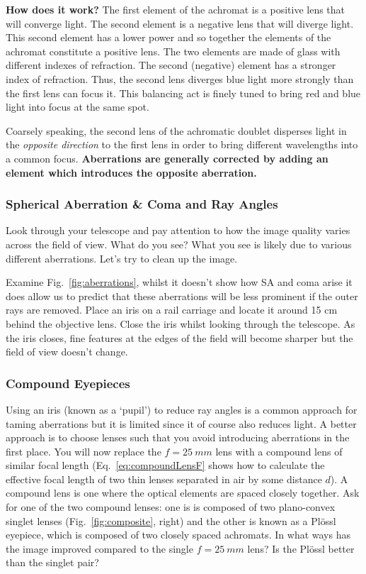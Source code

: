 \documentclass[a4paper]{report}
\begin{document}
	\textbf{How does it work?} 
	The first element of the achromat is a positive lens that will converge light. 
	The second element is a negative lens that will diverge light.
	This second element has a lower power and so together the elements of the achromat constitute a positive lens. 
	The two elements are made of glass with different indexes of refraction. 
	The second (negative) element has a stronger index of refraction. 
	Thus, the second lens diverges blue light more strongly than the first lens can focus it.
	This balancing act is finely tuned to bring red and blue light into focus at the same spot.
	
	Coarsely speaking, the second lens of the achromatic doublet disperses light in the \textit{opposite direction} to the first lens in order to bring different wavelengths into a common focus. 
	\textbf{Aberrations are generally corrected by adding an element which introduces the opposite aberration.}
	
	
	
	
	
	
	\subsubsection{Spherical Aberration \& Coma and Ray Angles}
	Look through your telescope and pay attention to how the image quality varies across the field of view. 
	What do you see?
	What you see is likely due to various different aberrations. 
	Let's try to clean up the image. 
	
	Examine Fig.~\ref{fig:aberrations}, whilst it doesn't show how SA and coma arise it does allow us to predict that these aberrations will be less prominent if the outer rays are removed. 
	Place an iris on a rail carriage and locate it around 15 cm behind the objective lens. 
	Close the iris whilst looking through the telescope. 
	As the iris closes, fine features at the edges of the field will become sharper but the field of view doesn't change. 
	
	
	
	
	\subsubsection{Compound Eyepieces}
	Using an iris (known as a `pupil') to reduce ray angles is a common approach for taming aberrations but it is limited since it of course also reduces light. 
	A better approach is to choose lenses such that you avoid introducing aberrations in the first place. 
	You will now replace the $f=25~mm$ lens with a compound lens of similar focal length (Eq.~\ref{eq:compoundLensF} shows how to calculate the effective focal length of two thin lenses separated in air by some distance $d$). 
	A compound lens is one where the optical elements are spaced closely together. 
	Ask for one of the two compound lenses: one is is composed of two plano-convex singlet lenses (Fig.~\ref{fig:composite}, right)
	and the other is known as a Pl\"{o}ssl eyepiece, which is composed of two closely spaced achromats. 
	In what ways has the image improved compared to the single $f=25~mm$ lens?
	Is the Pl\"{o}ssl better than the singlet pair?
	
\end{document}
